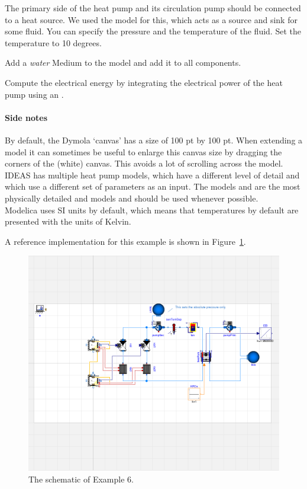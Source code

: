 \documentclass[10pt,a4paper]{article}
\begin{document}
The primary side of the heat pump and its circulation pump should be connected
to a heat source. We used the model  for this,
which acts as a source and sink for some fluid. You can specify the pressure
and the temperature of the fluid. Set the temperature to 10 degrees.

Add a \textit{water} Medium to the model and add it to all components.


Compute the electrical energy by integrating the electrical power of the heat pump
using an .


\paragraph{Side notes}
By default, the Dymola `canvas' has a size of 100 pt by 100 pt. 
When extending a model  it can sometimes be useful to enlarge this canvas size by dragging
the corners of the (white) canvas. 
This avoids a lot of scrolling across the model.\\

IDEAS has multiple heat pump models, which have a different level of detail
and which use a different set of parameters as an input.
The models 
and  are
the most physically detailed and models and should be used whenever possible.\\

Modelica uses SI units by default, which means that temperatures by default 
are presented with the units of Kelvin.

A reference implementation for this example is shown in Figure~\ref{fig:sche}.

\begin{figure}
\centering
\includegraphics[width=\linewidth]{Schematic6.png}
\caption{The schematic of Example 6.}
\label{fig:sche}
\end{figure}
\end{document}

